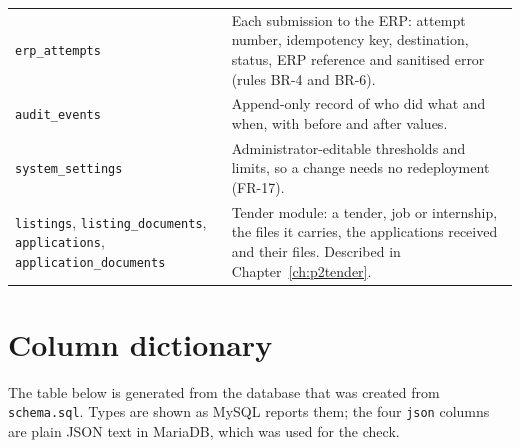 {\begin{longtable}{L{3.6cm}L{10.2cm}}
\texttt{erp\_attempts} & Each submission to the ERP: attempt number, idempotency key, destination, status, ERP reference and sanitised error (rules BR-4 and BR-6).\\
\texttt{audit\_events} & Append-only record of who did what and when, with before and after values.\\
\texttt{system\_settings} & Administrator-editable thresholds and limits, so a change needs no redeployment (FR-17).\\
\texttt{listings}, \texttt{listing\_documents}, \texttt{applications}, \texttt{application\_documents} & Tender module: a tender, job or internship, the files it carries, the applications received and their files. Described in Chapter~\ref{ch:p2tender}.\\
\hline
\end{longtable}}

\section{Column dictionary}
The table below is generated from the database that was created from \texttt{schema.sql}. Types are shown as MySQL reports them; the four \texttt{json} columns are plain JSON text in MariaDB, which was used for the check.


